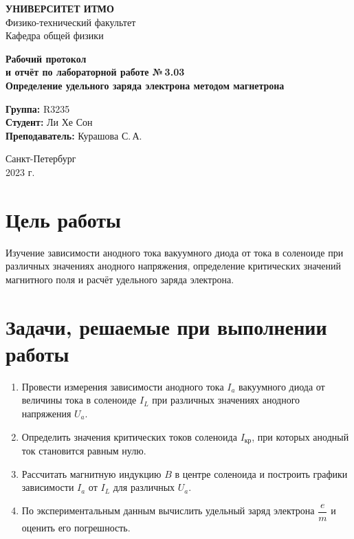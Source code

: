 \documentclass[14pt]{extarticle}
\begin{document}
\begin{titlepage}
    \begin{center}
        \small
        \textbf{УНИВЕРСИТЕТ ИТМО}\\
        Физико-технический факультет\\
        Кафедра общей физики
        
        \vfill
        
        \Large
        \textbf{Рабочий протокол}\\
        \textbf{и отчёт по лабораторной работе №\,3.03}\\
        \textbf{Определение удельного заряда электрона методом магнетрона}
        
        \vfill
        
        \normalsize
        \begin{flushleft}
            \textbf{Группа:} R3235\\
            \textbf{Студент:} Ли Хе Сон\\
            \textbf{Преподаватель:} Курашова С.\,А.
        \end{flushleft}
        
        \vfill
        
        Санкт-Петербург\\
        2023 г.
    \end{center}
\end{titlepage}

\section{Цель работы}

Изучение зависимости анодного тока вакуумного диода от тока в соленоиде при различных значениях анодного напряжения, определение критических значений магнитного поля и расчёт удельного заряда электрона.

\section{Задачи, решаемые при выполнении работы}

\begin{enumerate}
    \item Провести измерения зависимости анодного тока $I_a$ вакуумного диода от величины тока в соленоиде $I_L$ при различных значениях анодного напряжения $U_a$.
    \item Определить значения критических токов соленоида $I_{\text{кр}}$, при которых анодный ток становится равным нулю.
    \item Рассчитать магнитную индукцию $B$ в центре соленоида и построить графики зависимости $I_a$ от $I_L$ для различных $U_a$.
    \item По экспериментальным данным вычислить удельный заряд электрона $\dfrac{e}{m}$ и оценить его погрешность.
\end{enumerate}
\end{document}
